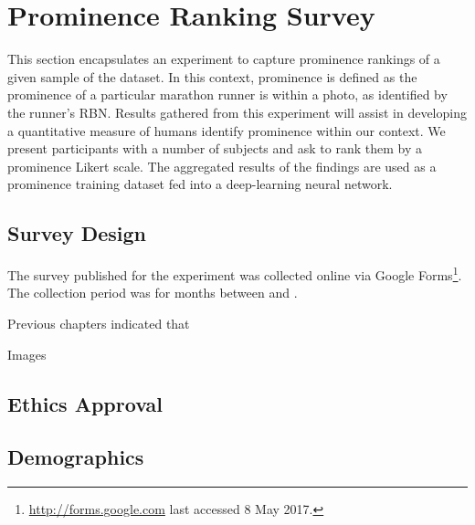 \section{Prominence Ranking Survey}
\label{sec:prominence_rank_survey}

This section encapsulates an experiment to capture prominence rankings of a given sample of the dataset.
In this context, prominence is defined as the prominence of a particular marathon runner is within a photo, as identified by the runner's RBN.  
Results gathered from this experiment will assist in developing a quantitative measure of humans identify prominence within our context.
We present participants with a number of subjects and ask to rank them by a prominence Likert scale.
The aggregated results of the findings are used as a prominence training dataset fed into a deep-learning neural network.

\subsection{Survey Design}
\label{sec:prominence_rank_survey_design}

The survey published for the experiment was collected online via Google Forms\footnote{\url{http://forms.google.com} last accessed 8 May 2017.}. The collection period was for  months between  and .

Previous chapters indicated that 

Images


\subsection{Ethics Approval}




\subsection{Demographics}
